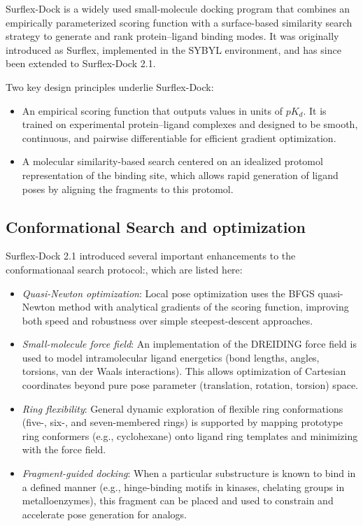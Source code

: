 \documentclass[12pt, a4paper]{article}
\begin{document}
Surflex-Dock is a widely used small-molecule docking program that combines an empirically parameterized scoring function with a surface-based similarity search strategy to generate and rank protein--ligand binding modes.\cite{CH7_Jain2003Surflex,CH7_Jain2007Surflex21} It was originally introduced as Surflex,\cite{CH7_Jain2003Surflex} implemented in the SYBYL environment, and has since been extended to Surflex-Dock 2.1.\cite{CH7_Jain2007Surflex21}

Two key design principles underlie Surflex-Dock:
\begin{itemize}
  \item An empirical scoring function that outputs values in units of $pK_d$. It is trained on experimental protein--ligand complexes and designed to be smooth, continuous, and pairwise differentiable for efficient gradient optimization.\cite{CH7_Jain2007Surflex21,CH7_Jain2006NegTrain}
  \item A molecular similarity-based search centered on an idealized protomol representation of the binding site, which allows rapid generation of ligand poses by aligning the fragments to this protomol.\cite{CH7_Jain2003Surflex}
\end{itemize}

\subsection{Conformational Search and optimization}

Surflex-Dock 2.1 introduced several important enhancements to the conformationaal search protocol:\cite{CH7_Jain2007Surflex21}, which are listed here:
\begin{itemize}
  \item \textit{Quasi-Newton optimization}: Local pose optimization uses the BFGS quasi-Newton method with analytical gradients of the scoring function, improving both speed and robustness over simple steepest-descent approaches.
  \item \textit{Small-molecule force field}: An implementation of the DREIDING force field is used to model intramolecular ligand energetics (bond lengths, angles, torsions, van der Waals interactions). This allows optimization of Cartesian coordinates beyond pure pose parameter (translation, rotation, torsion) space.
  \item \textit{Ring flexibility}: General dynamic exploration of flexible ring conformations (five-, six-, and seven-membered rings) is supported by mapping prototype ring conformers (e.g., cyclohexane) onto ligand ring templates and minimizing with the force field.
  \item \textit{Fragment-guided docking}: When a particular substructure is known to bind in a defined manner (e.g., hinge-binding motifs in kinases, chelating groups in metalloenzymes), this fragment can be placed and used to constrain and accelerate pose generation for analogs.
\end{itemize}
\end{document}
